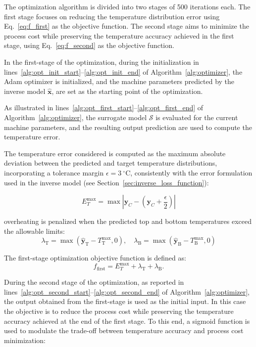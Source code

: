 The optimization algorithm is divided into two stages of 500 iterations each. The first stage focuses on reducing the temperature distribution error using Eq.~\ref{eq:f_first} as the objective function. The second stage aims to minimize the process cost while preserving the temperature accuracy achieved in the first stage, using Eq.~\ref{eq:f_second} as the objective function.

In the first-stage of the optimization, during the initialization in lines~\ref{alg:opt_init_start}--\ref{alg:opt_init_end} of Algorithm~\ref{alg:optimizer}, the Adam optimizer is initialized, and the machine parameters predicted by the inverse model $\mathbf{\hat{x}}$, are set as the starting point of the optimization. 

As illustrated in lines~\ref{alg:opt_first_start}--\ref{alg:opt_first_end} of Algorithm~\ref{alg:optimizer}, the surrogate model $\mathcal{S}$ is evaluated for the current machine parameters, and the resulting output prediction are used to compute the temperature error. 

The temperature error considered is computed as the maximum absolute deviation between the predicted and target temperature distributions, incorporating a tolerance margin $\epsilon = 3~^\circ\mathrm{C}$, consistently with the error formulation used in the inverse model (see Section~\ref{sec:inverse_loss_function}):

\begin{equation}
	E_T^{\text{max}} = \max \left| \mathbf{\hat{y}}_C - \left(\mathbf{y}_C + \frac{\epsilon}{2}\right) \right|
\label{eq:max_temp_error}
\end{equation}

\noindent overheating is penalized when the predicted top and bottom temperatures exceed the allowable limits:
\begin{equation}
	\lambda_\text{T} = \max(\mathbf{\hat{y}}_\text{T} - T_\text{T}^{\max}, 0), \quad
	\lambda_\text{B} = \max(\mathbf{\hat{y}}_\text{B} - T_\text{B}^{\max}, 0)
	\label{eq:temperature_penalties}
\end{equation}

The first-stage optimization objective function is defined as:
\begin{equation}
	f_{\text{first}} = E_T^{\text{max}} + \lambda_\text{T} + \lambda_\text{B}.
	\label{eq:f_first}
\end{equation}

During the second stage of the optimization, as reported in lines~\ref{alg:opt_second_start}--\ref{alg:opt_second_end} of Algorithm~\ref{alg:optimizer}, the output obtained from the first-stage is used as the initial input. In this case the objective is to reduce the process cost while preserving the temperature accuracy achieved at the end of the first stage. To this end, a sigmoid function is used to modulate the trade-off between temperature accuracy and process cost minimization:

